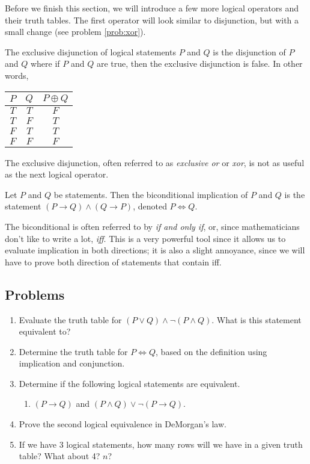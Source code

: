 Before we finish this section, we will introduce a few more logical operators and their truth tables. The first operator will look similar to disjunction, but with a small change (see problem \ref{prob:xor}).

\begin{definition}{}
	The exclusive disjunction of logical statements $P$ and $Q$ is the disjunction of $P$ and $Q$ where if $P$ and $Q$ are true, then the exclusive disjunction is false. In other words,
	\begin{center}
		\begin{tabular}{c | c | c}
			$P$ & $Q$ & $P\oplus Q$ \\
			\hline
			$T$ & $T$ & $F$         \\
			$T$ & $F$ & $T$         \\
			$F$ & $T$ & $T$         \\
			$F$ & $F$ & $F$
		\end{tabular}
	\end{center}
\end{definition}

The exclusive disjunction, often referred to as \textit{exclusive or} or \textit{xor}, is not as useful as the next logical operator.

\begin{definition}{}
	Let $P$ and $Q$ be statements. Then the biconditional implication of $P$ and $Q$ is the statement $(P\to Q)\land(Q\to P)$, denoted $P\iff Q$.
\end{definition}

The biconditional is often referred to by \textit{if and only if}, or, since mathematicians don't like to write a lot, \textit{iff}. This is a very powerful tool since it allows us to evaluate implication in both directions; it is also a slight annoyance, since we will have to prove both direction of statements that contain iff.

\subsection*{Problems}
\begin{enumerate}
	\item Evaluate the truth table for $(P\lor Q)\land\neg(P\land Q)$. What is this statement equivalent to?\label{prob:xor}
	\item Determine the truth table for $P \iff Q$, based on the definition using implication and conjunction.
	\item Determine if the following logical statements are equivalent.
	      \begin{enumerate}
	      	\item $(P\to Q)$ and $(P\land Q) \lor \neg(P\to Q)$.
	      \end{enumerate}
	\item Prove the second logical equivalence in DeMorgan's law.\label{prob:demorgan}
	\item If we have 3 logical statements, how many rows will we have in a given truth table? What about 4? $n$?
\end{enumerate}


